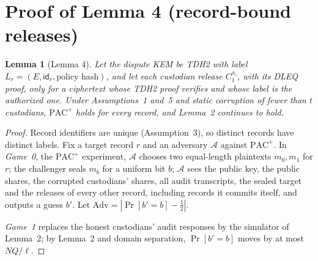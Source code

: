 \documentclass[11pt]{article}
\newtheorem*{lemmaS}{Lemma}
\newcommand{\PAC}{\mathrm{PAC}}
\begin{document}
\section{Proof of Lemma 4 (record-bound releases)}

\begin{lemmaS}[Lemma 4]
Let the dispute KEM be TDH2 with label $L_r=(E,\mathsf{id}_r,\text{policy hash})$, and let each custodian release $C_1^{x_i}$, with its DLEQ proof, only for a ciphertext whose TDH2 proof verifies and whose label is the authorized one. Under Assumptions~1 and~5 and static corruption of fewer than $t$ custodians, $\PAC^{+}$ holds for every record, and Lemma~2 continues to hold.
\end{lemmaS}

\begin{proof}
Record identifiers are unique (Assumption~3), so distinct records have distinct labels. Fix a target record $r$ and an adversary $\mathcal{A}$ against $\PAC^{+}$. In \emph{Game~0}, the $\PAC^{+}$ experiment, $\mathcal{A}$ chooses two equal-length plaintexts $m_0,m_1$ for $r$; the challenger seals $m_b$ for a uniform bit $b$; $\mathcal{A}$ sees the public key, the public shares, the corrupted custodians' shares, all audit transcripts, the sealed target and the releases of every other record, including records it commits itself, and outputs a guess $b'$. Let $\mathrm{Adv}=|\Pr[b'=b]-\tfrac12|$.

\emph{Game~1} replaces the honest custodians' audit responses by the simulator of Lemma~2; by Lemma~2 and domain separation, $\Pr[b'=b]$ moves by at most $NQ/\ell$.


\end{proof}
\end{document}
